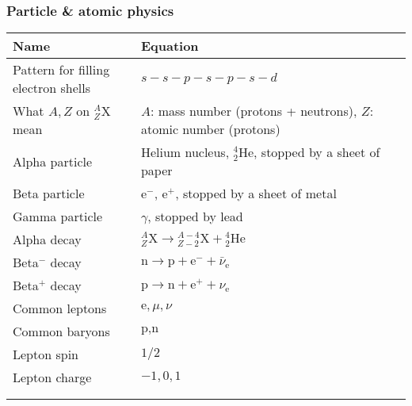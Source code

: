 \documentclass[11pt]{paper}
\begin{document}
\subsubsection*{Particle \& atomic physics}
\label{subsec:pap}
\centering
\label{my-label}
\bgroup
\def\arraystretch{2}
\begin{longtable}{ll}
\textbf{Name}       & \textbf{Equation}          \\ \hline
\multicolumn{1}{|l|}{Pattern for filling electron shells} & \multicolumn{1}{l|}{$s-s-p-s-p-s-d$} \\ \hline
\multicolumn{1}{|l|}{What $A,Z$ on ${}^A_Z\text{X}$ mean} & \multicolumn{1}{l|}{$A$: mass number (protons + neutrons), $Z$: atomic number (protons)} \\ \hline
\multicolumn{1}{|l|}{Alpha particle} & \multicolumn{1}{l|}{Helium nucleus, ${}^4_2\text{He}$, stopped by a sheet of paper} \\ \hline
\multicolumn{1}{|l|}{Beta particle} & \multicolumn{1}{l|}{$\text{e}^-$, $\text{e}^+$, stopped by a sheet of metal} \\ \hline
\multicolumn{1}{|l|}{Gamma particle} & \multicolumn{1}{l|}{$\gamma$, stopped by lead} \\ \hline
\multicolumn{1}{|l|}{Alpha decay} & \multicolumn{1}{l|}{${}^A_Z \text{X} \rightarrow {}^{A-4}_{Z-2}\text{X} + {}^4_2\text{He}$} \\ \hline
\multicolumn{1}{|l|}{Beta${}^-$ decay} & \multicolumn{1}{l|}{$\text{n} \rightarrow \text{p} + \text{e}^- + \bar{\nu}_\text{e}$} \\ \hline
\multicolumn{1}{|l|}{Beta${}^+$ decay} & \multicolumn{1}{l|}{$\text{p} \rightarrow \text{n} + \text{e}^+ + \nu_\text{e}$} \\ \hline
\multicolumn{1}{|l|}{Common leptons} & \multicolumn{1}{l|}{$\text{e},\mu,\nu$} \\ \hline
\multicolumn{1}{|l|}{Common baryons} & \multicolumn{1}{l|}{$\text{p},\text{n}$} \\ \hline
\multicolumn{1}{|l|}{Lepton spin} & \multicolumn{1}{l|}{$1/2$} \\ \hline
\multicolumn{1}{|l|}{Lepton charge} & \multicolumn{1}{l|}{$-1,0,1$} \\ \hline\\\\
\end{longtable}
\end{document}
